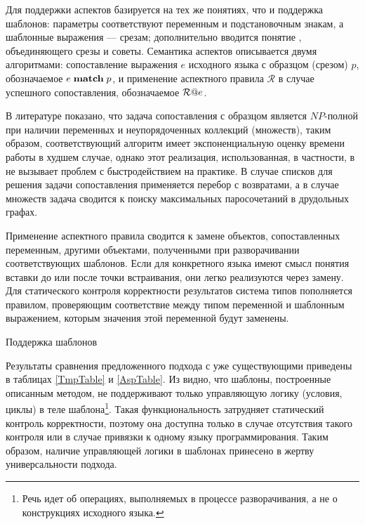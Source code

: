 Для поддержки аспектов базируется на тех же понятиях, что и поддержка шаблонов: параметры соответствуют переменным и подстановочным знакам, а шаблонные выражения --- срезам; дополнительно вводится понятие , объединяющего срезы и советы. Семантика аспектов описывается двумя алгоритмами: сопоставление выражения $e$ исходного языка с образцом (срезом) $p$, обозначаемое $e \; \mathbf{match} \; p$, и применение аспектного правила $\mathcal{R}$ в случае успешного сопоставления, обозначаемое $\mathcal{R}@e$.

В литературе показано, что задача сопоставления с образцом является $NP$-полной при наличии переменных и неупорядоченных коллекций (множеств), таким образом, соответствующий алгоритм имеет экспоненциальную оценку времени работы в худшем случае, однако этот реализация, использованная, в частности, в \GRM{} не вызывает проблем с быстродействием на практике. В случае списков для решения задачи сопоставления применяется перебор с возвратами, а в случае множеств задача сводится к поиску максимальных паросочетаний в друдольных графах. 

Применение аспектного правила сводится к замене объектов, сопоставленных переменным, другими объектами, полученными при разворачивании соответствующих шаблонов. Если для конкретного языка имеют смысл понятия вставки до или после точки встраивания, они легко реализуются через замену.
Для статического контроля корректности результатов система типов пополняется правилом, проверяющим соответствие между типом переменной и шаблонным выражением, которым значения этой переменной будут заменены.

\begin{table}[htb]
	\centering
\newcommand{\dissonly}[1]{}

	\caption{Поддержка шаблонов}\label{TmpTable}
\end{table}

Результаты сравнения предложенного подхода с уже существующими приведены в таблицах \ref{TmpTable} и \ref{AspTable}. 
Из  видно, что шаблоны, построенные описанным методом, не поддерживают только управляющую логику (условия, циклы) в теле шаблона\footnote{Речь идет об операциях, выполняемых в процессе разворачивания, а не о конструкциях исходного языка.}. Такая функциональность затрудняет статический контроль корректности, поэтому она доступна только в случае отсутствия такого контроля или в случае привязки к одному языку программирования. Таким образом, наличие управляющей логики в шаблонах принесено в жертву универсальности подхода. 

